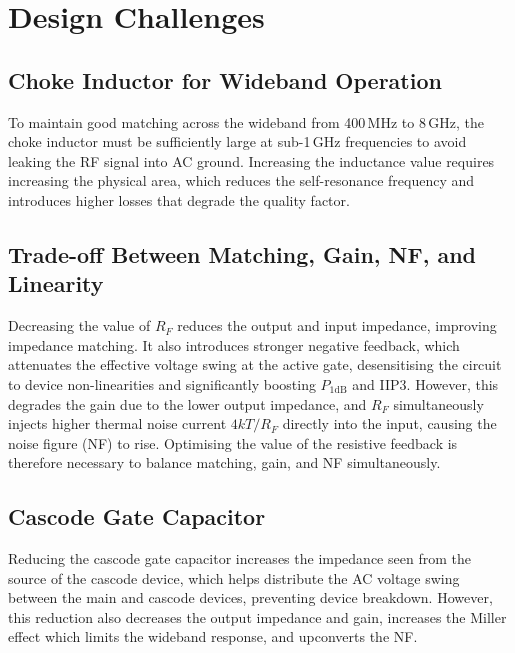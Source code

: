 \section{Design Challenges}
\label{sec:design_challenges}

\subsection{Choke Inductor for Wideband Operation}
\label{subsec:choke_inductor}

To maintain good matching across the wideband from 400\,MHz to 8\,GHz, the choke inductor must be sufficiently large at sub-1\,GHz frequencies to avoid leaking the RF signal into AC ground. Increasing the inductance value requires increasing the physical area, which reduces the self-resonance frequency and introduces higher losses that degrade the quality factor.

\subsection{Trade-off Between Matching, Gain, NF, and Linearity}
\label{subsec:tradeoff_matching}

Decreasing the value of $R_F$ reduces the output and input impedance, improving impedance matching. It also introduces stronger negative feedback, which attenuates the effective voltage swing at the active gate, desensitising the circuit to device non-linearities and significantly boosting $P_\text{1dB}$ and IIP3. However, this degrades the gain due to the lower output impedance, and $R_F$ simultaneously injects higher thermal noise current $4kT/R_F$ directly into the input, causing the noise figure (NF) to rise. Optimising the value of the resistive feedback is therefore necessary to balance matching, gain, and NF simultaneously.

\subsection{Cascode Gate Capacitor}
\label{subsec:cascode_cap}

Reducing the cascode gate capacitor increases the impedance seen from the source of the cascode device, which helps distribute the AC voltage swing between the main and cascode devices, preventing device breakdown. However, this reduction also decreases the output impedance and gain, increases the Miller effect which limits the wideband response, and upconverts the NF.

